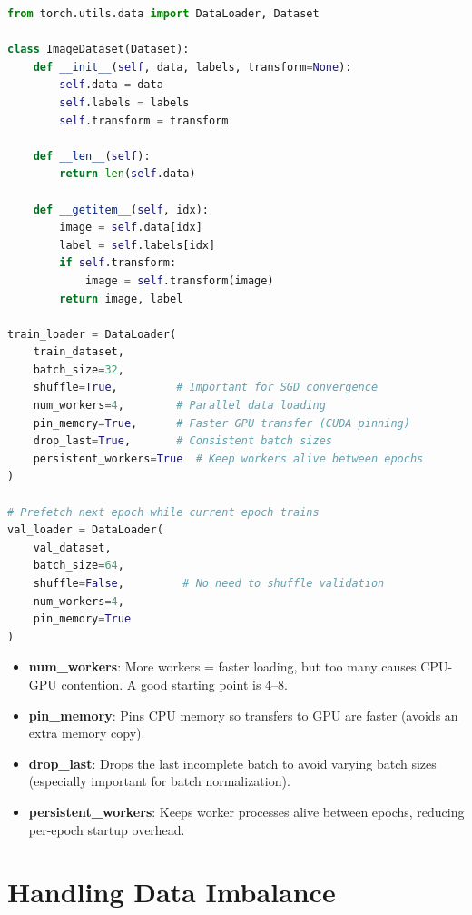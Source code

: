 \begin{code}
    \label{code:dataloader}
\begin{lstlisting}[language=python]
from torch.utils.data import DataLoader, Dataset

class ImageDataset(Dataset):
    def __init__(self, data, labels, transform=None):
        self.data = data
        self.labels = labels
        self.transform = transform
    
    def __len__(self):
        return len(self.data)
    
    def __getitem__(self, idx):
        image = self.data[idx]
        label = self.labels[idx]
        if self.transform:
            image = self.transform(image)
        return image, label

train_loader = DataLoader(
    train_dataset,
    batch_size=32,
    shuffle=True,         # Important for SGD convergence
    num_workers=4,        # Parallel data loading
    pin_memory=True,      # Faster GPU transfer (CUDA pinning)
    drop_last=True,       # Consistent batch sizes
    persistent_workers=True  # Keep workers alive between epochs
)

# Prefetch next epoch while current epoch trains
val_loader = DataLoader(
    val_dataset,
    batch_size=64,
    shuffle=False,         # No need to shuffle validation
    num_workers=4,
    pin_memory=True
)
\end{lstlisting}
\end{code}

\begin{properties}
\begin{itemize}
    \item \textbf{num\_workers}: More workers = faster loading, but too many causes CPU-GPU contention. A good starting point is 4--8.
    \item \textbf{pin\_memory}: Pins CPU memory so transfers to GPU are faster (avoids an extra memory copy).
    \item \textbf{drop\_last}: Drops the last incomplete batch to avoid varying batch sizes (especially important for batch normalization).
    \item \textbf{persistent\_workers}: Keeps worker processes alive between epochs, reducing per-epoch startup overhead.
\end{itemize}
\end{properties}

\section{Handling Data Imbalance}

